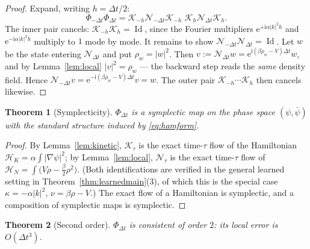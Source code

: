 \documentclass[11pt,a4paper]{article}
\theoremstyle{plain}
\newtheorem{theorem}{Theorem}[section]
\theoremstyle{definition}
\theoremstyle{remark}
\newcommand{\iu}{\mathrm{i}}
\newcommand{\eu}{\mathrm{e}}
\newcommand{\dt}{\Delta t}
\newcommand{\Kop}{\mathcal{K}}
\newcommand{\Nop}{\mathcal{N}}
\newcommand{\Flow}{\Phi}
\newcommand{\Ham}{\mathcal{H}}
\DeclareMathOperator{\Id}{Id}
\begin{document}
\begin{proof}
Expand, writing $h=\dt/2$:
\[
\Flow_{-\dt}\Flow_{\dt}
= \Kop_{-h}\Nop_{-\dt}\Kop_{-h}\;\Kop_{h}\Nop_{\dt}\Kop_{h}.
\]
The inner pair cancels: $\Kop_{-h}\Kop_{h}=\Id$, since the Fourier multipliers
$\eu^{+\iu\alpha|k|^2h}$ and $\eu^{-\iu\alpha|k|^2h}$ multiply to $1$ mode by mode. It
remains to show $\Nop_{-\dt}\Nop_{\dt}=\Id$. Let $w$ be the state entering $\Nop_{\dt}$
and put $\rho_w = |w|^2$. Then $v := \Nop_{\dt}w = \eu^{\iu(\beta\rho_w-V)\dt}w$, and by
Lemma~\ref{lem:local} $|v|^2 = \rho_w$ --- the backward step reads the \emph{same}
density field. Hence
$\Nop_{-\dt}v = \eu^{-\iu(\beta\rho_w-V)\dt}v = w$.
The outer pair $\Kop_{-h}\cdots\Kop_{h}$ then cancels likewise.
\end{proof}

\begin{theorem}[Symplecticity]
\label{thm:strangsympl}
$\Flow_{\dt}$ is a symplectic map on the phase space $(\psi,\bar\psi)$ with the standard
structure induced by \eqref{eq:hamform}.
\end{theorem}

\begin{proof}
By Lemma~\ref{lem:kinetic}, $\Kop_\tau$ is the exact time-$\tau$ flow of the Hamiltonian
$\Ham_K = \alpha\int|\nabla\psi|^2$; by Lemma~\ref{lem:local}, $\Nop_\tau$ is the exact
time-$\tau$ flow of $\Ham_N = \int\bigl(V\rho - \tfrac{\beta}{2}\rho^2\bigr)$. (Both
identifications are verified in the general learned setting in
Theorem~\ref{thm:learnedmain}(3), of which this is the special case $\kappa=-\alpha|k|^2$,
$\nu = \beta\rho - V$.) The exact flow of a Hamiltonian is symplectic, and a composition
of symplectic maps is symplectic.
\end{proof}

\begin{theorem}[Second order]
\label{thm:strangorder}
$\Flow_{\dt}$ is consistent of order $2$: its local error is $O(\dt^3)$.
\end{theorem}
\end{document}
